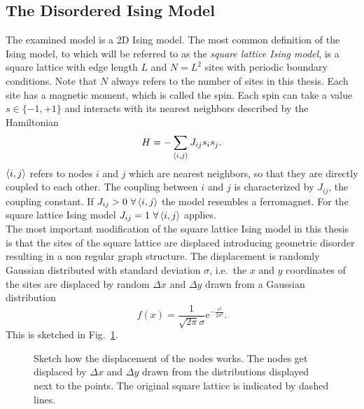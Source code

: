 \subsection{The Disordered Ising Model}
\label{ssec:isingmodel}
    The examined model is a 2D Ising model.
    The most common definition of the Ising model, to which will be referred to
    as the \emph{square lattice Ising model}, is a square lattice with
    edge length \(L\) and \(N=L^2\) sites with periodic boundary conditions.
    Note that \(N\) always refers to the number of sites in this thesis.
    Each site has a magnetic moment, which is called the spin. Each
    spin can take a value \(s \in \{-1,+1\}\) and interacts with its
    nearest neighbors described by the Hamiltonian
    \begin{equation}
        H = - \sum_{\left< i,j \right>}J_{ij}s_{i}s_{j}.
        \label{eq:hamiltonian}
    \end{equation}
    \(\left< i,j \right>\) refers to nodes \(i\) and \(j\) which are nearest
    neighbors, so that they are directly coupled to each other. The
    coupling between \(i\) and \(j\) is characterized by \(J_{ij}\),
    the coupling constant. If \(J_{ij} > 0 \ \forall \avg{i,j}\) the model resembles a ferromagnet.
    For the square lattice Ising model \(J_{ij} = 1 \ \forall \avg{i,j}\) applies.\\
    The most important modification of the square lattice Ising model in this
    thesis is that the sites of the square lattice are displaced introducing
    geometric disorder resulting in a non regular graph structure.
    The displacement is randomly Gaussian distributed with standard
    deviation \(\sigma\), i.e.\ the \(x\) and \(y\) coordinates of the
    sites are displaced by random \(\Delta x\) and \(\Delta y\) drawn
    from a Gaussian distribution
    \begin{equation}
        f(x)=\frac{1}{\sqrt{2\pi}\sigma}\mathrm{e}^{-\frac{x^2}{2\sigma^2}}.
        \label{eq:gauss}
    \end{equation}
    This is sketched in Fig.\ \ref{fig:displacement}.
    \begin{figure}[htbp]
        \centering
        
        \caption[Sketch how the Displacement works]
        {
            Sketch how the displacement of the nodes works. The nodes
            get displaced by \(\Delta x\) and \(\Delta y\) drawn from the
            distributions displayed next to the points. The original
            square lattice is indicated by dashed lines.
        }
        \label{fig:displacement}
    \end{figure}\\
